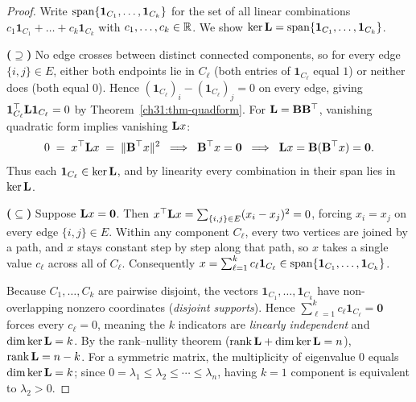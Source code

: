 \begin{proof}
Write $\operatorname{span}\{\mathbf{1}_{C_1},\dots,\mathbf{1}_{C_k}\}$ for the set of all linear combinations $c_1\mathbf{1}_{C_1} + \dots + c_k\mathbf{1}_{C_k}$ with $c_1,\dots,c_k\in\mathbb{R}$. We show $\ker \mathbf{L} = \operatorname{span}\{\mathbf{1}_{C_1},\dots,\mathbf{1}_{C_k}\}$.

\textbf{($\supseteq$)} No edge crosses between distinct connected components, so for every edge $\{i,j\}\in E$, either both endpoints lie in $C_\ell$ (both entries of $\mathbf{1}_{C_\ell}$ equal $1$) or neither does (both equal $0$). Hence $(\mathbf{1}_{C_\ell})_i - (\mathbf{1}_{C_\ell})_j = 0$ on every edge, giving $\mathbf{1}_{C_\ell}^\top \mathbf{L} \mathbf{1}_{C_\ell} = 0$ by Theorem~\ref{ch31:thm-quadform}. For $\mathbf{L} = \mathbf{B}\mathbf{B}^\top$, vanishing quadratic form implies vanishing $\mathbf{L} x$:
\[
  0 \;=\; x^\top \mathbf{L} x \;=\; \lVert\mathbf{B}^\top x\rVert^2
  \;\implies\; \mathbf{B}^\top x = \mathbf{0}
  \;\implies\; \mathbf{L} x = \mathbf{B}(\mathbf{B}^\top x) = \mathbf{0}.
\]
Thus each $\mathbf{1}_{C_\ell}\in\ker\mathbf{L}$, and by linearity every combination in their span lies in $\ker\mathbf{L}$.

\textbf{($\subseteq$)} Suppose $\mathbf{L} x = \mathbf{0}$. Then $x^\top \mathbf{L} x = \sum_{\{i,j\}\in E}(x_i - x_j)^2 = 0$, forcing $x_i = x_j$ on every edge $\{i,j\}\in E$. Within any component $C_\ell$, every two vertices are joined by a path, and $x$ stays constant step by step along that path, so $x$ takes a single value $c_\ell$ across all of $C_\ell$. Consequently $x = \sum_{\ell=1}^k c_\ell \mathbf{1}_{C_\ell} \in \operatorname{span}\{\mathbf{1}_{C_1},\dots,\mathbf{1}_{C_k}\}$.

Because $C_1,\dots,C_k$ are pairwise disjoint, the vectors $\mathbf{1}_{C_1},\dots,\mathbf{1}_{C_k}$ have non-overlapping nonzero coordinates (\emph{disjoint supports}). Hence $\sum_{\ell=1}^k c_\ell \mathbf{1}_{C_\ell} = \mathbf{0}$ forces every $c_\ell = 0$, meaning the $k$ indicators are \emph{linearly independent} and $\dim\ker\mathbf{L} = k$. By the rank--nullity theorem ($\operatorname{rank}\mathbf{L} + \dim\ker\mathbf{L} = n$), $\operatorname{rank}\mathbf{L} = n-k$. For a symmetric matrix, the multiplicity of eigenvalue $0$ equals $\dim\ker\mathbf{L} = k$; since $0=\lambda_1\le\lambda_2\le\cdots\le\lambda_n$, having $k=1$ component is equivalent to $\lambda_2 > 0$.
\end{proof}

